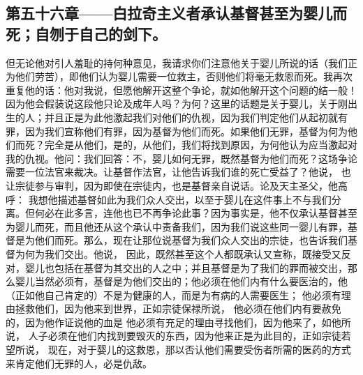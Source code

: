 
\subsection{第五十六章——白拉奇主义者承认基督甚至为婴儿而死；自刎于自己的剑下。}

但无论他对引人羞耻的持何种意见，我请求你们注意他关于婴儿所说的话（我们正为他们劳苦），即他们认为婴儿需要一位救主，否则他们将毫无救恩而死。我再次重复他的话：他对我说，但愿他解开这整个争论，就如他解开这个问题的结一般！因为他会假装说这段他只论及成年人吗？为何？这里的话题是关于婴儿，关于刚出生的人；并且正是为此他激起我们对他们的仇视，因为我们判定他们从起初就有罪，因为我们宣称他们有罪，因为基督为他们而死。如果他们无罪，基督为何为他们而死？完全是从他们，是的，从他们，我们将找到原因，为何他认为应当激起对我的仇视。他问：我们回答：不，婴儿如何无罪，既然基督为他们而死？这场争论需要一位法官来裁决。让基督作法官，让他告诉我们谁的死亡受益了？他说， 也让宗徒参与审判，因为即使在宗徒内，也是基督亲自说话。论及天主圣父，他高呼： 我想他描述基督如此为我们众人交出，以至于婴儿在这件事上不与我们分离。但何必在此多言，连他也已不再争论此事？因为事实是，他不仅承认基督甚至为婴儿而死，而且他还从这个承认中责备我们，因为我们说这些同一婴儿有罪，基督是为他们而死。那么，现在让那位说基督为我们众人交出的宗徒，也告诉我们基督为何为我们交出。他说， 因此，既然甚至这个人都既承认又宣称，既接受又反对，婴儿也包括在基督为其交出的人之中；并且基督是为了我们的罪而被交出，那么婴儿当然必须有，基督是为他们交出的；他必须在他们内有什么要医治的，他（正如他自己肯定的）不是为健康的人，而是为有病的人需要医生； 他必须有理由拯救他们，因为他来到世界，正如宗徒保禄所说， 他必须在他们内有要赦免的，因为他作证说他的血是 他必须有充足的理由寻找他们，因为他来了，如他所说， 人子必须在他们内找到要毁灭的东西，因为他来正是为此目的，正如宗徒若望所说， 现在，对于婴儿的这救恩，那以否认他们需要受伤者所需的医药的方式来肯定他们无罪的人，必是仇敌。\par

